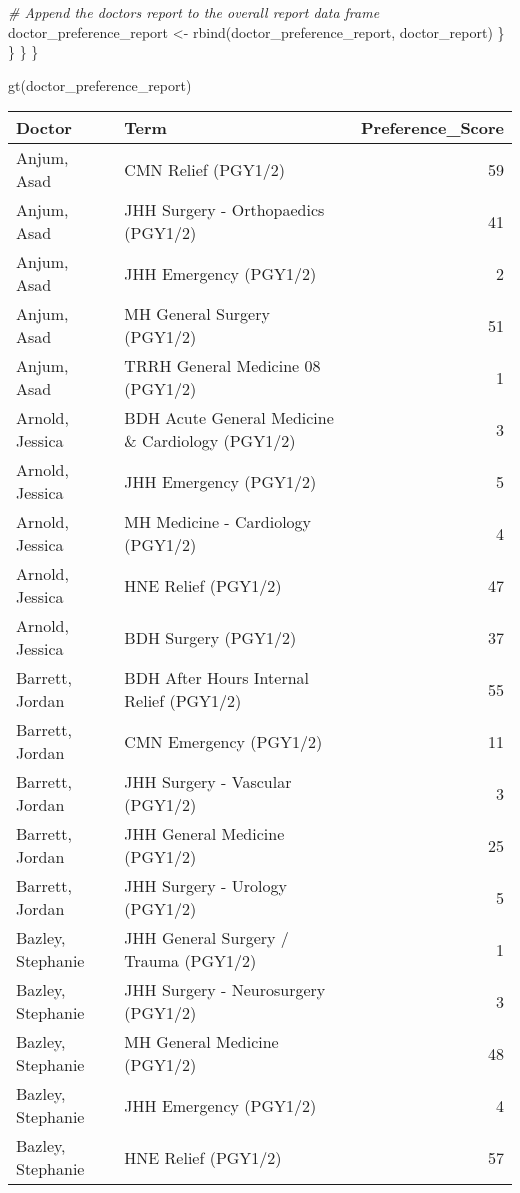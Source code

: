\documentclass[
]{article}
\newenvironment{Shaded}{\begin{snugshade}}{\end{snugshade}}
\newcommand{\CommentTok}[1]{\textcolor[rgb]{0.56,0.35,0.01}{\textit{#1}}}
\newcommand{\FunctionTok}[1]{\textcolor[rgb]{0.00,0.00,0.00}{#1}}
\newcommand{\NormalTok}[1]{#1}
\newcommand{\OtherTok}[1]{\textcolor[rgb]{0.56,0.35,0.01}{#1}}
\begin{document}
\begin{Shaded}
\begin{Highlighting}[]
        \CommentTok{\# Append the doctor\textquotesingle{}s report to the overall report data frame}
\NormalTok{        doctor\_preference\_report }\OtherTok{\textless{}{-}} \FunctionTok{rbind}\NormalTok{(doctor\_preference\_report, doctor\_report)}
\NormalTok{      \}}
\NormalTok{    \}}
\NormalTok{  \}}
\NormalTok{\}}


\FunctionTok{gt}\NormalTok{(doctor\_preference\_report)}
\end{Highlighting}
\end{Shaded}

\begin{longtable}{llr}
\toprule
Doctor & Term & Preference\_Score \\ 
\midrule\addlinespace[2.5pt]
Anjum, Asad & CMN Relief (PGY1/2) & 59 \\ 
Anjum, Asad & JHH Surgery - Orthopaedics (PGY1/2) & 41 \\ 
Anjum, Asad & JHH Emergency (PGY1/2) & 2 \\ 
Anjum, Asad & MH General Surgery (PGY1/2) & 51 \\ 
Anjum, Asad & TRRH General Medicine 08 (PGY1/2) & 1 \\ 
Arnold, Jessica & BDH Acute General Medicine \& Cardiology (PGY1/2) & 3 \\ 
Arnold, Jessica & JHH Emergency (PGY1/2) & 5 \\ 
Arnold, Jessica & MH  Medicine - Cardiology (PGY1/2) & 4 \\ 
Arnold, Jessica & HNE Relief (PGY1/2) & 47 \\ 
Arnold, Jessica & BDH Surgery (PGY1/2) & 37 \\ 
Barrett, Jordan & BDH After Hours Internal Relief (PGY1/2) & 55 \\ 
Barrett, Jordan & CMN Emergency (PGY1/2) & 11 \\ 
Barrett, Jordan & JHH Surgery - Vascular (PGY1/2) & 3 \\ 
Barrett, Jordan & JHH General Medicine (PGY1/2) & 25 \\ 
Barrett, Jordan & JHH Surgery - Urology (PGY1/2) & 5 \\ 
Bazley, Stephanie & JHH General Surgery / Trauma (PGY1/2) & 1 \\ 
Bazley, Stephanie & JHH Surgery - Neurosurgery (PGY1/2) & 3 \\ 
Bazley, Stephanie & MH General Medicine (PGY1/2) & 48 \\ 
Bazley, Stephanie & JHH Emergency (PGY1/2) & 4 \\ 
Bazley, Stephanie & HNE Relief (PGY1/2) & 57 \\ 

\end{longtable}
\end{document}
